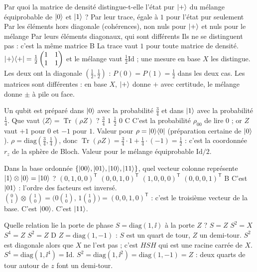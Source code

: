   {Par quoi la matrice de densité distingue-t-elle l'état pur $|+\rangle$ du mélange équiprobable de $|0\rangle$ et $|1\rangle$ ?}
  {Par leur trace, égale à $1$ pour l'état pur seulement}
  {Par les éléments hors diagonale (cohérences), non nuls pour $|+\rangle$ et nuls pour le mélange}
  {Par leurs éléments diagonaux, qui sont différents}
  {Ils ne se distinguent pas : c'est la même matrice}
  {B}
\qcmx
  {La trace vaut $1$ pour toute matrice de densité.}
  {$|+\rangle\langle +|=\frac12\begin{pmatrix}1&1\\1&1\end{pmatrix}$ et le mélange vaut $\frac12\mathrm{Id}$ ; une mesure en base $X$ les distingue.}
  {Les deux ont la diagonale $(\frac12,\frac12)$ : $P(0)=P(1)=\frac12$ dans les deux cas.}
  {Les matrices sont différentes : en base $X$, $|+\rangle$ donne $+$ avec certitude, le mélange donne $\pm$ à pile ou face.}

  {Un qubit est préparé dans $|0\rangle$ avec la probabilité $\frac34$ et dans $|1\rangle$ avec la probabilité $\frac14$. Que vaut $\langle Z\rangle=\operatorname{Tr}(\rho Z)$ ?}
  {$\frac34$}
  {$1$}
  {$\frac12$}
  {$0$}
  {C}
\qcmx
  {C'est la probabilité $\rho_{00}$ de lire $0$ ; or $Z$ vaut $+1$ pour $0$ et $-1$ pour $1$.}
  {Valeur pour $\rho=|0\rangle\langle 0|$ (préparation certaine de $|0\rangle$).}
  {$\rho=\mathrm{diag}(\frac34,\frac14)$, donc $\operatorname{Tr}(\rho Z)=\frac34\cdot1+\frac14\cdot(-1)=\frac12$ : c'est la coordonnée $r_z$ de la sphère de Bloch.}
  {Valeur pour le mélange équiprobable $\mathrm{Id}/2$.}

  {Dans la base ordonnée $\{|00\rangle,|01\rangle,|10\rangle,|11\rangle\}$, quel vecteur colonne représente $|1\rangle\otimes|0\rangle=|10\rangle$ ?}
  {$(0,1,0,0)^{\mathsf T}$}
  {$(0,0,1,0)^{\mathsf T}$}
  {$(1,0,0,0)^{\mathsf T}$}
  {$(0,0,0,1)^{\mathsf T}$}
  {B}
\qcmx
  {C'est $|01\rangle$ : l'ordre des facteurs est inversé.}
  {$\binom{0}{1}\otimes\binom{1}{0}=\big(0\binom{1}{0},\,1\binom{1}{0}\big)=(0,0,1,0)^{\mathsf T}$ : c'est le troisième vecteur de la base.}
  {C'est $|00\rangle$.}
  {C'est $|11\rangle$.}

  {Quelle relation lie la porte de phase $S=\mathrm{diag}(1,\ii)$ à la porte $Z$ ?}
  {$S=Z$}
  {$S^2=X$}
  {$S^4=Z$}
  {$S^2=Z$}
  {D}
\qcmx
  {$Z=\mathrm{diag}(1,-1)$ : $S$ est un quart de tour, $Z$ un demi-tour.}
  {$S^2$ est diagonale alors que $X$ ne l'est pas ; c'est $HSH$ qui est une racine carrée de $X$.}
  {$S^4=\mathrm{diag}(1,\ii^4)=\mathrm{Id}$.}
  {$S^2=\mathrm{diag}(1,\ii^2)=\mathrm{diag}(1,-1)=Z$ : deux quarts de tour autour de $z$ font un demi-tour.}

